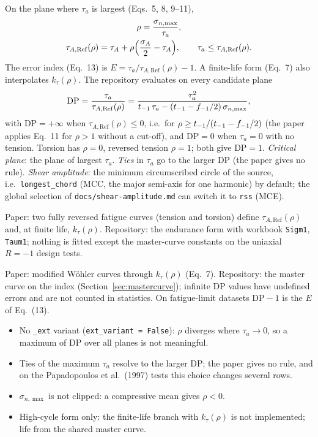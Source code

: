  On the plane where $\tau_a$ is largest (Eqs.~5, 8, 9--11),
\begin{gather}
\rho = \frac{\sigma_{n,\max}}{\tau_a} , \label{eq:mwcm-rho}\\
\tau_{A,\mathrm{Ref}}(\rho) = \tau_A + \rho\Bigl(\frac{\sigma_A}{2}-\tau_A\Bigr),\qquad
\tau_a \le \tau_{A,\mathrm{Ref}}(\rho) . \label{eq:mwcm-ref}
\end{gather}
The error index (Eq.~13) is $E=\tau_a/\tau_{A,\mathrm{Ref}}(\rho)-1$. A finite-life form (Eq.~7) also
interpolates $k_\tau(\rho)$. The repository evaluates on every candidate plane
\begin{equation}
\mathrm{DP} = \frac{\tau_a}{\tau_{A,\mathrm{Ref}}(\rho)}
 = \frac{\tau_a^2}{t_{-1}\,\tau_a - (t_{-1}-f_{-1}/2)\,\sigma_{n,\max}} ,
\label{eq:mwcm-dp}
\end{equation}
with $\mathrm{DP}=+\infty$ when $\tau_{A,\mathrm{Ref}}(\rho)\le0$, i.e.\ for
$\rho\ge t_{-1}/(t_{-1}-f_{-1}/2)$ (the paper applies Eq.~11 for $\rho>1$ without a cut-off), and $\mathrm{DP}=0$
when $\tau_a=0$ with no tension. Torsion has $\rho=0$, reversed tension $\rho=1$; both give
$\mathrm{DP}=1$. \emph{Critical plane}: the plane of largest $\tau_a$. \emph{Ties} in $\tau_a$ go to
the larger DP (the paper gives no rule). \emph{Shear amplitude}: the minimum circumscribed circle of
the source, i.e.\ \texttt{longest\_chord} (MCC, the major semi-axis for one harmonic) by default; the
global selection of \texttt{docs/shear-amplitude.md} can switch it to \texttt{rss} (MCE).

 Paper: two fully reversed fatigue curves (tension and torsion)
define $\tau_{A,\mathrm{Ref}}(\rho)$ and, at finite life, $k_\tau(\rho)$. Repository: the endurance
form with workbook \texttt{Sigm1}, \texttt{Taum1}; nothing is fitted except the master-curve
constants on the uniaxial $R=-1$ design tests.

 Paper: modified W\"ohler curves through $k_\tau(\rho)$ (Eq.~7). Repository: the master
curve on the index (Section~\ref{sec:mastercurve}); infinite DP values have undefined errors and are
not counted in statistics. On fatigue-limit datasets $\mathrm{DP}-1$ is the $E$ of Eq.~(13).

\begin{itemize}
\item No \texttt{\_ext} variant (\texttt{ext\_variant = False}): $\rho$ diverges where $\tau_a\to0$,
  so a maximum of DP over all planes is not meaningful.
\item Ties of the maximum $\tau_a$ resolve to the larger DP; the paper gives no rule, and on the
  Papadopoulos et al.\ (1997) tests this choice changes several rows.
\item $\sigma_{n,\max}$ is not clipped: a compressive mean gives $\rho<0$.
\item High-cycle form only: the finite-life branch with $k_\tau(\rho)$ is not implemented; life from
  the shared master curve.
\end{itemize}

